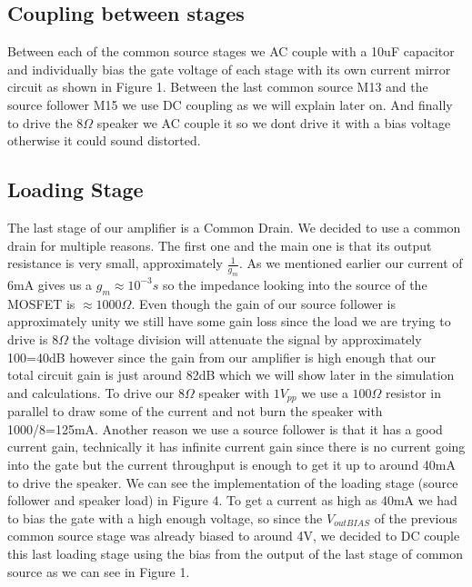 \documentclass[11pt, twoside, letterpaper]{article}
\begin{document}
\subsection{Coupling between stages}

Between each of the common source stages we AC couple with a 10uF capacitor and individually bias the gate voltage of each stage with its own current 
mirror circuit as shown in Figure 1. Between the last common source M13 and the source follower M15 we use DC coupling as we will explain later on. 
And finally to drive the $8\Omega$ speaker we AC couple it so we dont drive it with a bias voltage otherwise it could sound distorted.

\subsection{Loading Stage}
The last stage of our amplifier is a Common Drain. We decided to use a common drain for multiple reasons. The first one and the main one
is that its output resistance is very small, approximately $\frac{1}{g_m}$. As we mentioned earlier our current of 6mA gives us a $g_m\approx10^{-3}s$
so the impedance looking into the source of the MOSFET is $\approx 1000\Omega$. Even though the gain of our source follower is approximately unity we
still have some gain loss since the load we are trying to drive is $8\Omega$ the voltage division will attenuate the signal by approximately 100=40dB 
however since the gain from our amplifier is high enough that our total circuit gain is just around 82dB which we will show later in the simulation 
and calculations. To drive our $8\Omega$ speaker with $1V_{pp}$ we use a $100\Omega$ resistor in parallel to draw some of the current and not burn 
the speaker with 1000/8=125mA. Another reason we use a source follower is that it has a good current gain, technically it has infinite current gain 
since there is no current going into the gate but the current throughput is enough to get it up to around 40mA to drive the speaker. We can see the 
implementation of the loading stage (source follower and speaker load) in Figure 4. To get a current as high as 40mA we had to bias the gate with a 
high enough voltage, so since the $V_{outBIAS}$ of the previous common source stage was already biased to around 4V, we decided to DC couple this 
last loading stage using the bias from the output of the last stage of common source as we can see in Figure 1.
\end{document}
